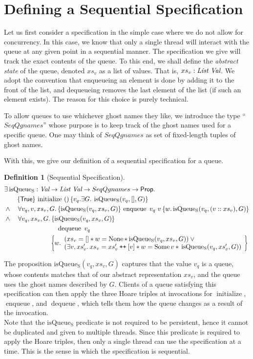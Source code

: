\documentclass[a4paper, 10pt]{report}
\theoremstyle{definition}
\newtheorem{definition}{Definition}[section]
\newcommand{\initialise}{\operatorname{initialize}}
\newcommand{\enqueue}{\operatorname{enqueue}}
\newcommand{\dequeue}{\operatorname{dequeue}}
\newcommand{\isqueueseq}{\operatorname{isQueue_{S}}}
\newcommand{\SeqQgnames}{SeqQgnames}
\newcommand{\vq}{v_q}
\newcommand{\nodeval}{\valB}
\newcommand{\absvalue}{\val}
\newcommand{\absvalueList}{xs_v}
\newcommand{\Qg}{G}
\newcommand\catenate{\mathbin{\text{\ttfamily\upshape ++}}}
\newcommand{\seqspecinitHTGen}[2]{\hoare{\TRUE}{\initialise \ \TT}{#1 . \Exists #2. \isqueueseq(#1, [], #2)}}
\newcommand{\seqspecinitGen}[2]{\seqspecinitHTGen{#1}{#2}}
\newcommand{\seqspecinit}{\seqspecinitGen{\vq}{\Qg}}
\newcommand{\seqspecenqHT}[4]{\hoare{\isqueueseq(#1, #3, #4)}{\enqueue \ #1 \ #2}{\valB . \isqueueseq(#1, (#2 :: #3), #4)}}
\newcommand{\seqspecenqGen}[4]{\All #1, #2, #3, #4. \seqspecenqHT{#1}{#2}{#3}{#4}}
\newcommand{\seqspecenq}{\seqspecenqGen{\vq}{\absvalue}{\absvalueList}{\Qg}}
\newcommand{\seqspecdeqHT}[3]{\hoareV[t]{\isqueueseq(#1, #2, #3)}{\dequeue \ #1}{\nodeval . \begin{array}{l}(#2 = [] \star{} \nodeval = \None \star{} \isqueueseq(#1, #2, #3)) \lor{}\\ (\Exists \absvalue, #2' . #2 = #2' \catenate [\absvalue] \star{} \nodeval = \Some \absvalue \star{} \isqueueseq(#1, #2', #3)) \end{array}}}
\newcommand{\seqspecdeqGen}[3]{\All #1, #2, #3. \seqspecdeqHT{#1}{#2}{#3}}
\newcommand{\seqspecdeq}{\seqspecdeqGen{\vq}{\absvalueList}{\Qg}}
\begin{document}
\section{Defining a Sequential Specification}
\label{QueueSpecs:section:seq}

Let us first consider a specification in the simple case where we do not allow for concurrency. In this case, we know that only a single thread will interact with the queue at any given point in a sequential manner. The specification we give will track the exact contents of the queue. To this end, we shall define the \textit{abstract state} of the queue, denoted $\absvalueList$ as a list of \heaplang values. That is, $\absvalueList : \List ~ \Val$. We adopt the convention that enqueueing an element is done by adding it to the front of the list, and dequeueing removes the last element of the list (if such an element exists). The reason for this choice is purely technical.

To allow queues to use whichever ghost names they like, we introduce the type ``$\SeqQgnames$'' whose purpose is to keep track of the ghost names used for a specific queue. One may think of $\SeqQgnames$ as set of fixed-length tuples of ghost names.

With this, we give our definition of a sequential specification for a queue.
\begin{definition}[Sequential Specification]\label{QueueSpecs:spec:seq}
\begin{align*}
  &\Exists \isqueueseq : \Val \to \List ~ \Val \to \SeqQgnames \to \Prop.\\
  &\quad\quad\seqspecinit\\
  &\land{}\quad\seqspecenq\\
  &\land{}\quad\seqspecdeq
\end{align*}
\end{definition}

The proposition $\isqueueseq(\vq, \absvalueList, \Qg)$ captures that the value $\vq$ is a queue, whose contents matches that of our abstract representation $\absvalueList$, and the queue uses the ghost names described by $\Qg$. Clients of a queue satisfying this specification can then apply the three Hoare triples at invocations for $\initialise$, $\enqueue$, and $\dequeue$, which tells them how the queue changes as a result of the invocation.\\
Note that the $\isqueueseq$ predicate is not required to be persistent, hence it cannot be duplicated and given to multiple threads. Since this predicate is required to apply the Hoare triples, then only a single thread can use the specification at a time. This is the sense in which the specification is sequential.
\end{document}
